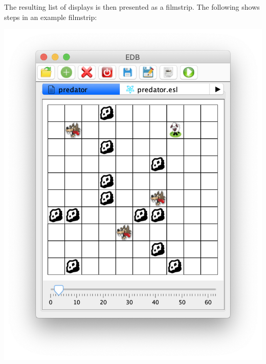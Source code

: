 \documentclass[5p,times]{elsarticle}
\begin{document}
The resulting list of displays is then presented as a filmstrip. The following shows steps in an example filmstrip:
\begin{center}
\includegraphics[width=\columnwidth]{pred1}
\end{center}
\end{document}
